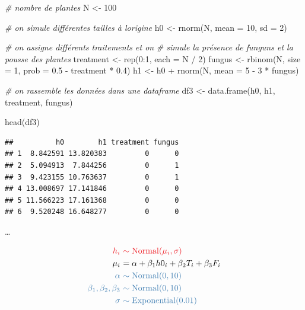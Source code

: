\documentclass[
  a4paper,11pt,twoside,onecolumn,openright,final,oldfontcommands]{memoir}
\newenvironment{Shaded}{\begin{snugshade}}{\end{snugshade}}
\newcommand{\AttributeTok}[1]{\textcolor[rgb]{0.77,0.63,0.00}{#1}}
\newcommand{\CommentTok}[1]{\textcolor[rgb]{0.56,0.35,0.01}{\textit{#1}}}
\newcommand{\DecValTok}[1]{\textcolor[rgb]{0.00,0.00,0.81}{#1}}
\newcommand{\FloatTok}[1]{\textcolor[rgb]{0.00,0.00,0.81}{#1}}
\newcommand{\FunctionTok}[1]{\textcolor[rgb]{0.00,0.00,0.00}{#1}}
\newcommand{\NormalTok}[1]{#1}
\newcommand{\OtherTok}[1]{\textcolor[rgb]{0.56,0.35,0.01}{#1}}
\newcommand{\SpecialCharTok}[1]{\textcolor[rgb]{0.00,0.00,0.00}{#1}}
\theoremstyle{definition}
\theoremstyle{definition}
\theoremstyle{definition}
\theoremstyle{definition}
\theoremstyle{remark}
\begin{document}
\begin{Shaded}
\begin{Highlighting}[]
\CommentTok{\# nombre de plantes}
\NormalTok{N }\OtherTok{\textless{}{-}} \DecValTok{100}

\CommentTok{\# on simule différentes tailles à l\textquotesingle{}origine}
\NormalTok{h0 }\OtherTok{\textless{}{-}} \FunctionTok{rnorm}\NormalTok{(N, }\AttributeTok{mean =} \DecValTok{10}\NormalTok{, }\AttributeTok{sd =} \DecValTok{2}\NormalTok{)}

\CommentTok{\# on assigne différents traitements et on}
\CommentTok{\# simule la présence de funguns et la pousse des plantes}
\NormalTok{treatment }\OtherTok{\textless{}{-}} \FunctionTok{rep}\NormalTok{(}\DecValTok{0}\SpecialCharTok{:}\DecValTok{1}\NormalTok{, }\AttributeTok{each =}\NormalTok{ N }\SpecialCharTok{/} \DecValTok{2}\NormalTok{)}
\NormalTok{fungus }\OtherTok{\textless{}{-}} \FunctionTok{rbinom}\NormalTok{(N, }\AttributeTok{size =} \DecValTok{1}\NormalTok{, }\AttributeTok{prob =} \FloatTok{0.5} \SpecialCharTok{{-}}\NormalTok{ treatment }\SpecialCharTok{*} \FloatTok{0.4}\NormalTok{)}
\NormalTok{h1 }\OtherTok{\textless{}{-}}\NormalTok{ h0 }\SpecialCharTok{+} \FunctionTok{rnorm}\NormalTok{(N, }\AttributeTok{mean =} \DecValTok{5} \SpecialCharTok{{-}} \DecValTok{3} \SpecialCharTok{*}\NormalTok{ fungus)}

\CommentTok{\# on rassemble les données dans une dataframe}
\NormalTok{df3 }\OtherTok{\textless{}{-}} \FunctionTok{data.frame}\NormalTok{(h0, h1, treatment, fungus)}

\FunctionTok{head}\NormalTok{(df3)}
\end{Highlighting}
\end{Shaded}

\begin{verbatim}
##          h0        h1 treatment fungus
## 1  8.842591 13.820383         0      0
## 2  5.094913  7.844256         0      1
## 3  9.423155 10.763637         0      1
## 4 13.008697 17.141846         0      0
## 5 11.566223 17.161368         0      0
## 6  9.520248 16.648277         0      0
\end{verbatim}

\ldots{}

\[
\begin{aligned}
\color{orangered}{h_{i}} \ &\color{orangered}{\sim \mathrm{Normal}(\mu_{i}, \sigma)} \\
\color{black}{\mu_{i}} \ &\color{black}{= \alpha + \beta_{1} h0_{i} + \beta_{2} T_{i} + \beta_{3} F_{i}} \\
\color{steelblue}{\alpha} \ &\color{steelblue}{\sim \mathrm{Normal}(0, 10)} \\
\color{steelblue}{\beta_{1}, \beta_{2}, \beta_{3}} \ &\color{steelblue}{\sim \mathrm{Normal}(0, 10)} \\
\color{steelblue}{\sigma} \ &\color{steelblue}{\sim \mathrm{Exponential}(0.01)}
\end{aligned}
\]
\end{document}
